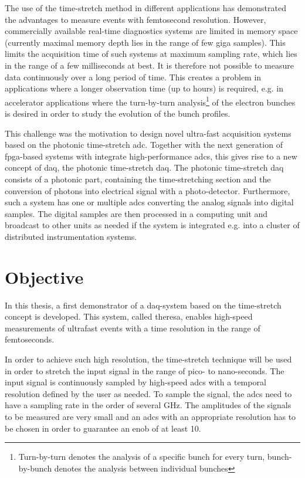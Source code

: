 The use of the time-stretch method in different applications has demonstrated the advantages to measure events with femtosecond resolution.
However, commercially available real-time diagnostics systems are limited in memory space (currently maximal memory depth lies in the range of few giga samples). 
This limits the acquisition time of such systems at maximum sampling rate, which lies in the range of a few milliseconds at best.
It is therefore not possible to measure data continuously over a long period of time. 
This creates a problem in applications where a longer observation time (up to hours) is required, e.g. in accelerator applications where the turn-by-turn analysis\footnote{Turn-by-turn denotes the analysis of a specific bunch for every turn, bunch-by-bunch denotes the analysis between individual bunches} of the electron bunches is desired in order to study the evolution of the bunch profiles. 

This challenge was the motivation to design novel ultra-fast acquisition systems based on the photonic time-stretch \gls{adc}. 
Together with the next generation of \gls{fpga}-based systems with integrate high-performance \glspl{adc}, this gives rise to a new concept of \gls{daq}, the photonic time-stretch \gls{daq}.
The photonic time-stretch \gls{daq} consists of a photonic part, containing the time-stretching section and the conversion of photons into electrical signal with a photo-detector. 
Furthermore, such a system has one or multiple \glspl{adc} converting the analog signals into digital samples.
The digital samples are then processed in a computing unit and broadcast to other units as needed if the system is integrated e.g. into a cluster of distributed instrumentation systems. 
 

\section{Objective}
In this thesis, a first demonstrator of a \gls{daq}-system based on the time-stretch concept is developed.
This system, called \gls{theresa}, enables high-speed measurements of ultrafast events with a time resolution in the range of femtoseconds.

In order to achieve such high resolution, the time-stretch technique will be used in order to stretch the input signal in the range of pico- to nano-seconds.
The input signal is continuously sampled by high-speed \glspl{adc} with a temporal resolution defined by the user as needed.
To sample the signal, the \glspl{adc} need to have a sampling rate in the order of several \si{\GHz}.
The amplitudes of the signals to be measured are very small and an \glspl{adc} with an appropriate resolution has to be chosen in order to guarantee an \gls{enob} of at least \SI{10}{\bits}. \cite{bielwaski}

